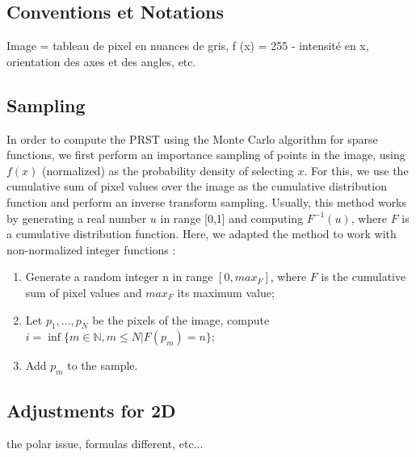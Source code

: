 \documentclass[10pt,a4paper]{article}			%
\begin{document}
	\subsection {Conventions et Notations}
Image = tableau de pixel en nuances de gris, f (x) = 255 - intensité en x, orientation des axes et des angles, etc.

	\subsection{Sampling}
In order to compute the PRST using the Monte Carlo algorithm for sparse functions, we first perform an importance sampling of points in the image, using $f(x)$ (normalized) as the probability density of selecting $x$. For this, we use the cumulative sum of pixel values over the image as the cumulative distribution function and perform an inverse transform sampling. Usually, this method works by generating a real number $u$ in range [0,1] and computing $F^{-1}(u)$, where $F$ is a cumulative distribution function. Here, we adapted the method to work with non-normalized integer functions :
\begin{enumerate}
\item Generate a random integer n in range $[0,max_F]$, where $F$ is the cumulative sum of pixel values and $max_F$ its maximum value;
\item Let $p_1,...,p_N$ be the pixels of the image, compute $i=\inf\{m\in \mathbb{N}, m\leq N |  F(p_m) = n\}$;
\item Add $p_m$ to the sample.
\end{enumerate}



	\subsection{Adjustments for 2D}
	
	the polar issue, formulas different, etc...
\end{document}

